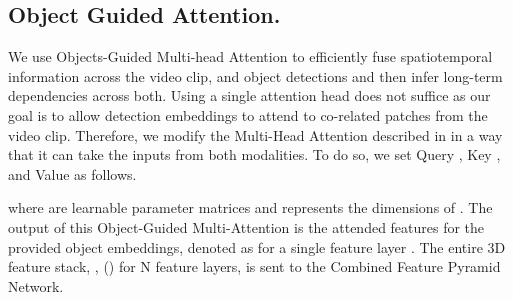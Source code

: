 \documentclass[10pt,twocolumn,letterpaper]{article}
\begin{document}
\subsection{Object Guided Attention.}
We use Objects-Guided Multi-head Attention to efficiently fuse spatiotemporal information across the video clip, and object detections and then infer long-term dependencies across both. Using a single attention head does not suffice as our goal is to allow detection embeddings to attend to co-related patches from the video clip. Therefore, we modify the Multi-Head Attention described in \cite{vaswani_attn} in a way that it can take the inputs from both modalities. To do so, we set Query , Key , and Value  as follows.



where  are learnable parameter matrices and  represents the dimensions of . The output of this Object-Guided Multi-Attention is the attended features for the provided object embeddings, denoted as  for a single feature layer . The entire 3D feature stack, , () for N feature layers, is sent to the Combined Feature Pyramid Network. \\



\begin{table*}[t]
\caption{Results in Top-5 mean Average Precision on the validation and test sets of EGO4D v2. In the header of the table, N+V stands for Noun + Verb and N+TTC stands for Noun + Time to Contact. Best results per column within a section of comparable results (horizontal lines) are reported in bold}
\label{table:results}
\vspace{-7pt}
\end{table*}
\end{document}
